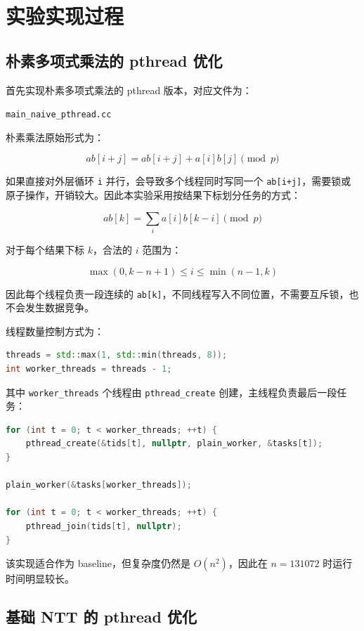 \documentclass[UTF8,a4paper,12pt]{ctexart}
\begin{document}
\section{实验实现过程}

\subsection{朴素多项式乘法的 pthread 优化}

首先实现朴素多项式乘法的 pthread 版本，对应文件为：

\begin{center}
\texttt{main\_naive\_pthread.cc}
\end{center}

朴素乘法原始形式为：

\[
ab[i+j] = ab[i+j] + a[i]b[j] \pmod p
\]

如果直接对外层循环 \texttt{i} 并行，会导致多个线程同时写同一个 \texttt{ab[i+j]}，需要锁或原子操作，开销较大。因此本实验采用按结果下标划分任务的方式：

\[
ab[k] = \sum_i a[i]b[k-i] \pmod p
\]

对于每个结果下标 \(k\)，合法的 \(i\) 范围为：

\[
\max(0,k-n+1) \le i \le \min(n-1,k)
\]

因此每个线程负责一段连续的 \texttt{ab[k]}，不同线程写入不同位置，不需要互斥锁，也不会发生数据竞争。

线程数量控制方式为：

\begin{lstlisting}[language=C++]
threads = std::max(1, std::min(threads, 8));
int worker_threads = threads - 1;
\end{lstlisting}

其中 \texttt{worker\_threads} 个线程由 \texttt{pthread\_create} 创建，主线程负责最后一段任务：

\begin{lstlisting}[language=C++]
for (int t = 0; t < worker_threads; ++t) {
    pthread_create(&tids[t], nullptr, plain_worker, &tasks[t]);
}

plain_worker(&tasks[worker_threads]);

for (int t = 0; t < worker_threads; ++t) {
    pthread_join(tids[t], nullptr);
}
\end{lstlisting}

该实现适合作为 baseline，但复杂度仍然是 \(O(n^2)\)，因此在 \(n=131072\) 时运行时间明显较长。

\subsection{基础 NTT 的 pthread 优化}
\end{document}
